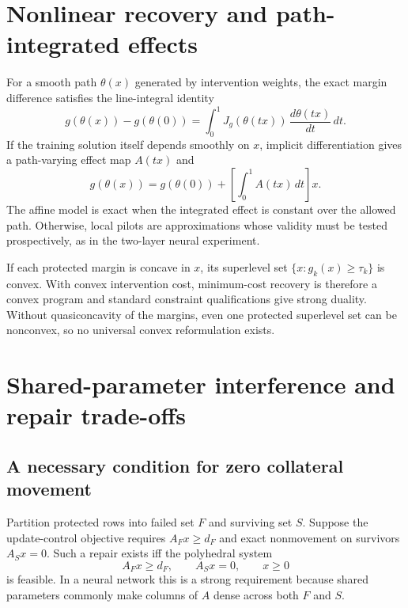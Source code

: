 \documentclass[11pt,letterpaper]{article}
\theoremstyle{plain}
\newcommand{\1}{\mathbf 1}
\begin{document}
\section{Nonlinear recovery and path-integrated effects}
For a smooth path $\theta(x)$ generated by intervention weights, the exact margin difference satisfies the line-integral identity
\begin{equation}
 g(\theta(x))-g(\theta(0))=\int_0^1 J_g(\theta(tx))\,\frac{d\theta(tx)}{dt}\,dt.
\label{eq:s_integrated_effect}
\end{equation}
If the training solution itself depends smoothly on $x$, implicit differentiation gives a path-varying effect map $A(tx)$ and
\begin{equation}
 g(\theta(x))=g(\theta(0))+\left[\int_0^1 A(tx)\,dt\right]x.
\label{eq:s_integrated_A}
\end{equation}
The affine model is exact when the integrated effect is constant over the allowed path. Otherwise, local pilots are approximations whose validity must be tested prospectively, as in the two-layer neural experiment.

If each protected margin is concave in $x$, its superlevel set $\{x:g_k(x)\ge\tau_k\}$ is convex. With convex intervention cost, minimum-cost recovery is therefore a convex program and standard constraint qualifications give strong duality. Without quasiconcavity of the margins, even one protected superlevel set can be nonconvex, so no universal convex reformulation exists.

\section{Shared-parameter interference and repair trade-offs}
\subsection{A necessary condition for zero collateral movement}
Partition protected rows into failed set $F$ and surviving set $S$. Suppose the update-control objective requires $A_Fx\ge d_F$ and exact nonmovement on survivors $A_Sx=0$. Such a repair exists iff the polyhedral system
\begin{equation}
 A_Fx\ge d_F,\qquad A_Sx=0,\qquad x\ge0
\label{eq:s_zero_collateral}
\end{equation}
is feasible. In a neural network this is a strong requirement because shared parameters commonly make columns of $A$ dense across both $F$ and $S$.
\end{document}
